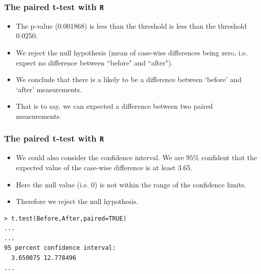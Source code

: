\documentclass[a4]{beamer}
\begin{document}
\begin{frame}[fragile]
\frametitle{The paired t-test with \texttt{R}}
\begin{itemize}
\item The p-value ($0.001868$) is less than the threshold is less than the threshold $0.0250$.
\item We reject the null hypothesis (mean of case-wise differences being zero, i.e. expect no difference between ``before" and ``after").
\item We conclude that there is a likely to be a difference between `before' and `after' measurements.
\item That is to say, we can expected a difference between two paired measurements.
\end{itemize}
\end{frame}
\begin{frame}[fragile]
\frametitle{The paired t-test with \texttt{R}}
\begin{itemize}
\item We could also consider the confidence interval. We are $95\%$ confident that the expected value of the case-wise difference is at least 3.65.
\item Here the null value (i.e. 0) is not within the range of the confidence limits.
\item Therefore we reject the null hypothesis.
\end{itemize}
\begin{verbatim}
> t.test(Before,After,paired=TRUE)
...
...
95 percent confidence interval:
  3.650075 12.778496
...
\end{verbatim}
\end{frame}



\end{document}

